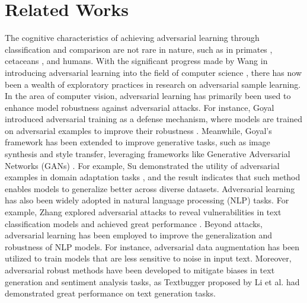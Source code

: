\section{Related Works}
The cognitive characteristics of achieving adversarial learning through classification and comparison are not rare in nature, such as in primates \citep{firestone2020performance}, cetaceans \citep{connor2006social}, and humans\citep{firestone2020performance}. With the significant progress made by Wang in introducing adversarial learning into the field of computer science \citep{wang2017generative}, there has now been a wealth of exploratory practices in research on adversarial sample learning. In the area of computer vision, adversarial learning has primarily been used to enhance model robustness against adversarial attacks. For instance, Goyal introduced adversarial training as a defense mechanism, where models are trained on adversarial examples to improve their robustness \citep{goyal2023survey}. Meanwhile, Goyal’s framework has been extended to improve generative tasks, such as image synthesis and style transfer, leveraging frameworks like Generative Adversarial Networks (GANs) \citep{goodfellow2020generative}. For example, Su demonstrated the utility of adversarial examples in domain adaptation tasks \citep{su2020active}, and the result indicates that such method enables models to generalize better across diverse datasets. Adversarial learning has also been widely adopted in natural language processing (NLP) tasks. For example, Zhang explored adversarial attacks to reveal vulnerabilities in text classification models and achieved great performance \citep{zhang2020adversarial}. Beyond attacks, adversarial learning has been employed to improve the generalization and robustness of NLP models. For instance, adversarial data augmentation has been utilized to train models that are less sensitive to noise in input text. Moreover, adversarial robust methods have been developed to mitigate biases in text generation and sentiment analysis tasks, as Textbugger proposed by Li et al. had demonstrated great performance on text generation tasks.

